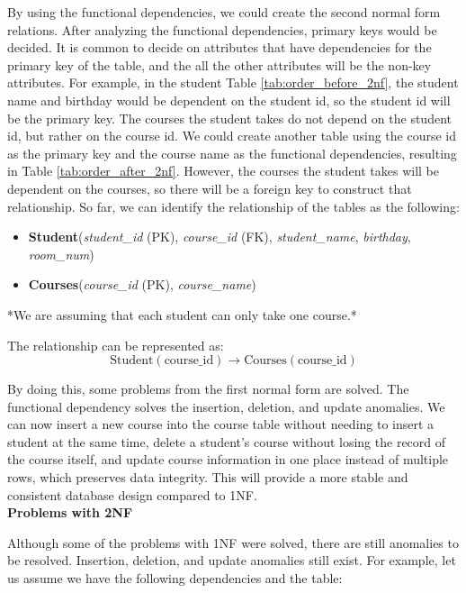 By using the functional dependencies, we could create the second normal form relations. After analyzing the functional dependencies,
primary keys would be decided. It is common to decide on attributes that have dependencies
for the primary key of the table, and the all the other attributes will be the non-key attributes.
For example, in the student Table \ref{tab:order_before_2nf}, the student name and birthday would be dependent on the student id, so the student id will be the primary key.
The courses the student takes do not depend on the student id, but rather on the course id.
We could create another table using the course id as the primary key and the course name as the functional dependencies, resulting in Table \ref{tab:order_after_2nf}.
However, the courses the student takes will be dependent on the courses, so there will be a foreign key to construct that relationship.
So far, we can identify the relationship of the tables as the following:

\begin{itemize}
    \item \textbf{Student}(\textit{student\_id} (PK), \textit{course\_id} (FK), \textit{student\_name}, \textit{birthday}, \textit{room\_num}) 
    \item \textbf{Courses}(\textit{course\_id} (PK), \textit{course\_name})
\end{itemize}

\noindent
*We are assuming that each student can only take one course.*

\noindent
The relationship can be represented as:
\[
\text{Student}(\text{course\_id}) \rightarrow \text{Courses}(\text{course\_id})
\]




By doing this, some problems from the first normal form are solved.
The functional dependency solves the insertion, deletion, and update anomalies.
We can now insert a new course into the course table without needing to insert a student at the same time,
delete a student’s course without losing the record of the course itself, and update course information in one place instead of multiple rows,
which preserves data integrity. This will provide a more stable and consistent database design compared to 1NF. \\

\textbf{Problems with 2NF}

Although some of the problems with 1NF were solved, there are still anomalies to be resolved. Insertion, deletion, and update anomalies still exist. 
For example, let us assume we have the following dependencies and the table:

